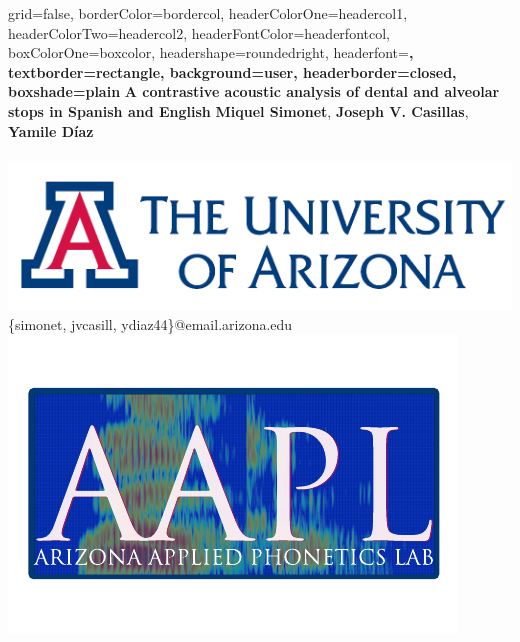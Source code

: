 \documentclass[a0paper,portrait,columns=2]{baposter}
\begin{document}
\begin{poster}{
grid=false,
borderColor=bordercol, %
headerColorOne=headercol1, %
headerColorTwo=headercol2, %
headerFontColor=headerfontcol, %
boxColorOne=boxcolor, %
headershape=roundedright, %
headerfont=\Large\sf\bf, %
textborder=rectangle,
background=user,
headerborder=closed, %
boxshade=plain
}
{}
%
%
{\sf\bf \LARGE{A contrastive acoustic analysis of dental and alveolar stops in Spanish and English}}
{\vspace{.6em} \textbf{Miquel Simonet}, \textbf{Joseph V. Casillas}, \textbf{Yamile D\'iaz}\\ 
 \\
{\hspace{-7in}\includegraphics[scale=0.2]{UA_logo}\phantom{.}} \\
{\vspace{-.4in}\smaller \{simonet, jvcasill, ydiaz44\}@email.arizona.edu} \\
{\vspace{-.45in}\phantom{.}\hspace{7in}\includegraphics[scale=0.35]{aalp_logo}}\vspace{-.6in}}





\end{poster}
\end{document}
